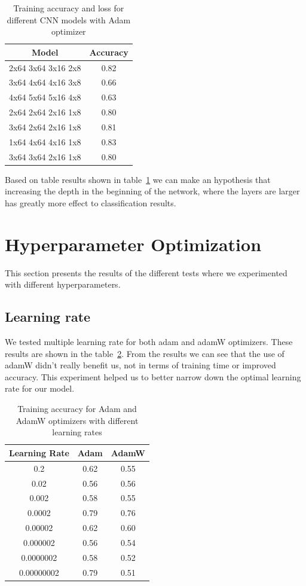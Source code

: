 \documentclass[12pt,a4paper,english
]{tunithesis}
\begin{document}
\begin{table}[h!]
\centering
\begin{tabular}{|c|c|}
\hline
\textbf{Model} & \textbf{Accuracy}  \\ \hline
2x64 3x64 3x16 2x8 & 0.82 \\ \hline
3x64 4x64 4x16 3x8 & 0.66 \\ \hline
4x64 5x64 5x16 4x8 & 0.63 \\ \hline
2x64 2x64 2x16 1x8 & 0.80 \\ \hline
3x64 2x64 2x16 1x8 & 0.81 \\ \hline
1x64 4x64 4x16 1x8 & 0.83 \\ \hline
3x64 3x64 2x16 1x8 & 0.80 \\ \hline
\end{tabular}
\caption{Training accuracy and loss for different CNN models with Adam optimizer}
\label{tab:models}
\end{table}

Based on table results shown in table~\ref{tab:models} we can make an hypothesis that increasing the depth in the beginning of the network, where the layers are larger has greatly more effect to classification results.

\section{Hyperparameter Optimization}
This section presents the results of the different tests where we experimented with different hyperparameters.

\subsection{Learning rate}
We tested multiple learning rate for both adam and adamW optimizers. These results are shown in the table~\ref{tab:learningrates}. From the results we can see that the use of adamW didn't really benefit us, not in terms of training time or improved accuracy. This experiment helped us to better narrow down the optimal learning rate for our model.
\begin{table}[h!]
\centering
\begin{tabular}{|c|c|c|}
\hline
\textbf{Learning Rate} & \textbf{Adam} & \textbf{AdamW} \\ \hline
0.2 & 0.62 & 0.55 \\ \hline
0.02 & 0.56 & 0.56 \\ \hline
0.002 & 0.58 & 0.55 \\ \hline
0.0002 & 0.79 & 0.76 \\ \hline
0.00002 & 0.62 & 0.60 \\ \hline
0.000002 & 0.56 & 0.54 \\ \hline
0.0000002 & 0.58 & 0.52 \\ \hline
0.00000002 & 0.79 & 0.51 \\ \hline
\end{tabular}
\caption{Training accuracy for Adam and AdamW optimizers with different learning rates}
\label{tab:learningrates}
\end{table}
\end{document}
